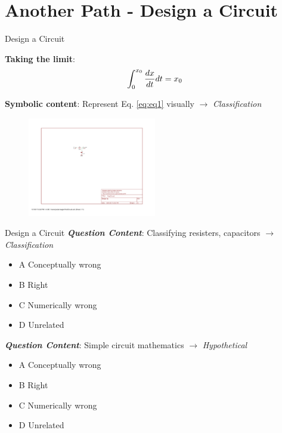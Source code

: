 \documentclass{beamer}
\begin{document}
\section{Another Path - Design a Circuit}

\begin{frame}{Design a Circuit}
\begin{tcolorbox}
\textbf{Taking the limit}:
\begin{equation} 
\int_{0}^{x_{\rm 0}} \frac{dx}{dt} dt = x_{\rm 0}
\end{equation}
\end{tcolorbox}
\vspace{0.5cm}
\alert{\textbf{Symbolic content}}: Represent Eq. \ref{eq:eq1} visually $\to$ \textit{\alert{Classification}} \\
\begin{figure}
\centering
\includegraphics[width=0.5\textwidth,trim=9.5cm 13cm 15cm 6cm,clip=true]{figures/FirstCircuit.pdf}
\end{figure}
\end{frame}

\begin{frame}{Design a Circuit}
\small
\textbf{\textit{Question Content}}: Classifying resisters, capacitors $\to$ \textit{\alert{Classification}}
\begin{itemize}
\item A Conceptually wrong
\item B Right
\item C Numerically wrong
\item D Unrelated
\end{itemize}
\textbf{\textit{Question Content}}: Simple circuit mathematics $\to$ \textit{\alert{Hypothetical}}
\begin{itemize}
\item A Conceptually wrong
\item B Right
\item C Numerically wrong
\item D Unrelated
\end{itemize}
\end{frame}
\end{document}
